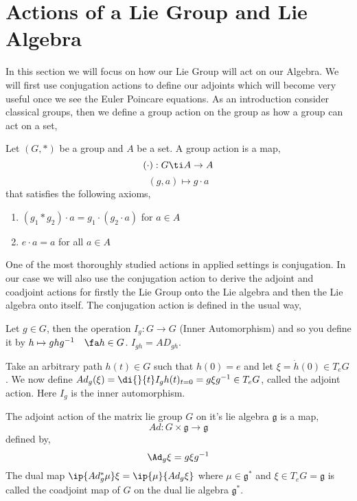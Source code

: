 
\section{Actions of a Lie Group and Lie Algebra}
In this section we will focus on how our Lie Group will act on our Algebra. We will first use conjugation actions to define our adjoints which will become very useful once we see the Euler Poincare equations. As an introduction consider classical groups, then we define a group action on the group as how a group can act on a set,
\begin{ndefi}
  Let $(G, *)$ be a group and $A$ be a set. A group action is a map,
  $$ (\cdot) : G \ti A \to A $$
  $$ (g, a) \mapsto g \cdot a $$
  that satisfies the following axioms,
  \begin{enumerate}[(\bfseries{A}1)]
    \item $(g_1 * g_2) \cdot a = g_1 \cdot (g_2 \cdot a)$ for $a \in A$
    \item $e \cdot a = a$ for all $a \in A$
  \end{enumerate}
\end{ndefi}

\noindent
One of the most thoroughly studied actions in applied settings is conjugation. In our case we will also use the conjugation action to derive the adjoint and coadjoint actions for firstly the Lie Group onto the Lie algebra and then the Lie algebra onto itself. The conjugation action is defined in the usual way,

\begin{ndefi}
  Let $g \in G$, then the operation $I_g : G \to G$ (Inner Automorphism) and so you define it by $h \mapsto ghg^{-1}\quad\fa h \in G$. $I_{gh} = AD_{gh}$.
\end{ndefi}

\noindent
Take an arbitrary path $h(t) \in {G}$ such that $h(0) = e$ and let $\xi = \dot h(0) \in T_eG$. We now define $Ad_g(\xi) = \di {}{t} I_g h(t)_{t=0} = g \xi g^{-1} \in T_eG$, called the adjoint action. Here $I_g$ is the inner automorphism.

\begin{ndefi}
  The adjoint action of the matrix lie group $G$ on it's lie algebra $\mathfrak{g}$ is a map,
  $$ Ad : G \times \mathfrak{g} \to \mathfrak{g} $$
  defined by,
  $$ \Ad_g \xi = g\xi g^{-1} $$
  The dual map $\ip {Ad^*_g \mu} \xi = \ip {\mu} {Ad_g\xi}$ where $\mu \in \mathfrak{g}^*$ and $\xi \in T_eG = \mathfrak{g}$ is called the coadjoint map of $G$ on the dual lie algebra $\mathfrak{g}^*$.
\end{ndefi}

